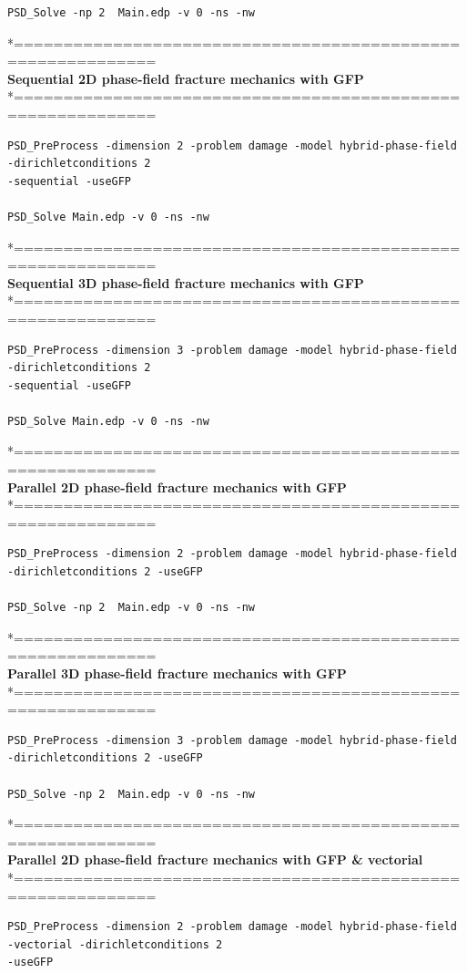 {{\begin{lstlisting}[style=Linux]
PSD_Solve -np 2  Main.edp -v 0 -ns -nw   
\end{lstlisting}
*============================================================\\
\textbf{ Sequential 2D phase-field fracture mechanics with GFP }\\
*============================================================\\
\begin{lstlisting}[style=Linux]
PSD_PreProcess -dimension 2 -problem damage -model hybrid-phase-field  -dirichletconditions 2 
-sequential -useGFP   

PSD_Solve Main.edp -v 0 -ns -nw   
\end{lstlisting}
*============================================================\\
\textbf{ Sequential 3D phase-field fracture mechanics with GFP} \\
*============================================================\\
\begin{lstlisting}[style=Linux]
PSD_PreProcess -dimension 3 -problem damage -model hybrid-phase-field  -dirichletconditions 2 
-sequential -useGFP   

PSD_Solve Main.edp -v 0 -ns -nw   
\end{lstlisting}
*============================================================\\
\textbf{ Parallel 2D phase-field fracture mechanics with GFP} \\
*============================================================\\
\begin{lstlisting}[style=Linux]
PSD_PreProcess -dimension 2 -problem damage -model hybrid-phase-field -dirichletconditions 2 -useGFP   

PSD_Solve -np 2  Main.edp -v 0 -ns -nw   
\end{lstlisting}
*============================================================\\
\textbf{ Parallel 3D phase-field fracture mechanics with GFP }\\
*============================================================\\
\begin{lstlisting}[style=Linux]
PSD_PreProcess -dimension 3 -problem damage -model hybrid-phase-field -dirichletconditions 2 -useGFP   

PSD_Solve -np 2  Main.edp -v 0 -ns -nw   
\end{lstlisting}
*============================================================\\
\textbf{ Parallel 2D phase-field fracture mechanics with GFP \& vectorial} \\
*============================================================\\
\begin{lstlisting}[style=Linux]
PSD_PreProcess -dimension 2 -problem damage -model hybrid-phase-field -vectorial -dirichletconditions 2 
-useGFP   


\end{lstlisting}}}
